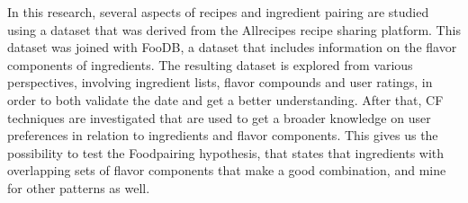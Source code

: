 In this research, several aspects of recipes and ingredient pairing are studied using a dataset that was derived from the Allrecipes recipe sharing platform.
This dataset was joined with FooDB, a dataset that includes information on the flavor components of ingredients.
The resulting dataset is explored from various perspectives, involving ingredient lists, flavor compounds and user ratings, in order to both validate the date and get a better understanding.
After that, CF techniques are investigated that are used to get a broader knowledge on user preferences in relation to ingredients and flavor components. 
This gives us the possibility to test the Foodpairing hypothesis, that states that ingredients with overlapping sets of flavor components that make a good combination, and mine for other patterns as well.